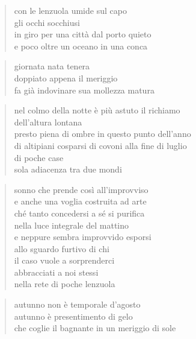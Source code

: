 \begin{verse}
    con le lenzuola umide sul capo\\
    gli occhi socchiusi\\
    in giro per una città dal porto quieto\\
    e poco oltre un oceano in una conca
\end{verse}

\clearpage


\begin{verse}
    giornata nata tenera\\
    doppiato appena il meriggio\\
    fa già indovinare sua mollezza matura
\end{verse}

\clearpage


\begin{verse}
    nel colmo della notte è più astuto il richiamo\\
    dell'altura lontana\\
    presto piena di ombre in questo punto dell'anno\\
    di altipiani cosparsi di covoni alla fine di luglio\\
    di poche case\\
    sola adiacenza tra due mondi
\end{verse}

\clearpage


\begin{verse}
    sonno che prende così all'improvviso\\
    e anche una voglia costruita ad arte\\
    ché tanto concedersi a sé si purifica\\
    nella luce integrale del mattino\\
    e neppure sembra improvvido esporsi\\
    allo sguardo furtivo di chi\\
    il caso vuole a sorprenderci\\
    abbracciati a noi stessi\\
    nella rete di poche lenzuola
\end{verse}

\clearpage


\begin{verse}
    autunno non è temporale d'agosto\\
    autunno è presentimento di gelo\\
    che coglie il bagnante in un meriggio di sole
\end{verse}

